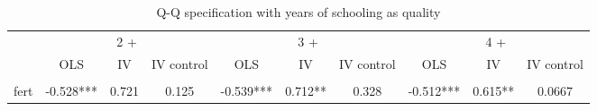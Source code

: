 \documentclass{article}[11pt,subeqn]
\begin{document}
\begin{spacing}{1.25}
\begin{sidewaystable}[!htbp]
\caption{Q-Q specification with years of schooling as quality}
\vspace{-3mm}
\label{tab:YrsEduc}
\begin{center}
\begin{tabular}{lccccccccc} \toprule 
 & \multicolumn{3}{c}{2 +} &   \multicolumn{3}{c}{3 +} &  \multicolumn{3}{c}{4 +} \\  \cmidrule(r){2-4} \cmidrule(r){5-7} \cmidrule(r){8-10} 
& OLS & IV & IV control & OLS & IV & IV control & OLS & IV & IV control \\ \midrule
\begin{footnotesize}\end{footnotesize}&\begin{footnotesize}\end{footnotesize}&\begin{footnotesize}\end{footnotesize}&\begin{footnotesize}\end{footnotesize}&\begin{footnotesize}\end{footnotesize}&\begin{footnotesize}\end{footnotesize}&\begin{footnotesize}\end{footnotesize}&\begin{footnotesize}\end{footnotesize}&\begin{footnotesize}\end{footnotesize}&\begin{footnotesize}\end{footnotesize}\\
fert & -0.528*** & 0.721 & 0.125 & -0.539*** & 0.712** & 0.328 & -0.512*** & 0.615** & 0.0667 \\

\end{tabular}
\end{center}
\end{sidewaystable}
\end{spacing}
\end{document}
